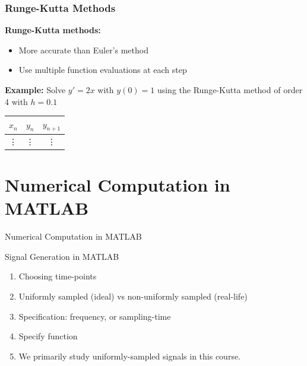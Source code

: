 \documentclass[aspectratio=169,xcolor=dvipsnames,svgnames,x11names,fleqn]{beamer}
\begin{document}
\begin{frame}
  \frametitle{Runge-Kutta Methods}
  \textbf{Runge-Kutta methods:}
  \begin{itemize}
    \item More accurate than Euler's method
    \item Use multiple function evaluations at each step
  \end{itemize}
  \textbf{Example:} Solve $y' = 2x$ with $y(0) = 1$ using the Runge-Kutta method of order 4 with $h = 0.1$
  \begin{table}
    \begin{tabular}{c|c|c}
      $x_n$ & $y_n$ & $y_{n+1}$ \\
      \hline
      \vdots & \vdots & \vdots
    \end{tabular}
  \end{table}
\end{frame}

\section{Numerical Computation in MATLAB}



\begin{frame}{}
    \begin{center}
    \Huge \bf \color{DarkBlue}
    \faFire
    
Numerical Computation in MATLAB

\end{center}
\end{frame}


\begin{frame}[containsverbatim]{Signal Generation in MATLAB}

\begin{enumerate}
\item Choosing time-points
\item Uniformly sampled (ideal) vs non-uniformly sampled (real-life)
\item Specification: frequency, or sampling-time
\item Specify function
\item We primarily study uniformly-sampled signals in this course.
\end{enumerate}

\end{frame}
\end{document}
